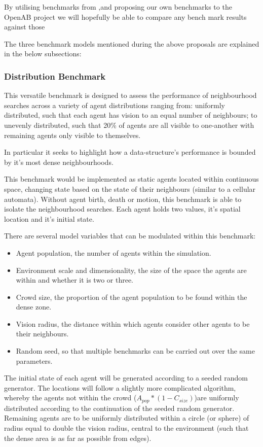     By utilising benchmarks from ,and proposing our own benchmarks to the OpenAB project we will hopefully be able to compare any bench mark results against those
    
    The three benchmark models mentioned during the above proposals are explained in the below subsections:    
    \subsubsection*{Distribution Benchmark}
        This versatile benchmark is designed to assess the performance of neighbourhood searches across a variety of agent distributions ranging from: uniformly distributed, such that each agent has vision to an equal number of neighbours; to unevenly distributed, such that 20\% of agents are all visible to one-another with remaining agents only visible to themselves.
        
        In particular it seeks to highlight how a data-structure's performance is bounded by it's most dense neighbourhoods. 
        
        This benchmark would be implemented as static agents located within continuous space, changing state based on the state of their neighbours (similar to a cellular automata). Without agent birth, death or motion, this benchmark is able to isolate the neighbourhood searches. Each agent holds two values, it's spatial location and it's initial state.
        
        There are several model variables that can be modulated within this benchmark:
        \begin{itemize}
          \item Agent population, the number of agents within the simulation.
          \item Environment scale and dimensionality, the size of the space the agents are within and whether it is two or three.
          \item Crowd size, the proportion of the agent population to be found within the dense zone.
          \item Vision radius, the distance within which agents consider other agents to be their neighbours.
          \item Random seed, so that multiple benchmarks can be carried out over the same parameters.
        \end{itemize}
        
        The initial state of each agent will be generated according to a seeded random generator. The locations will follow a slightly more complicated algorithm, whereby the agents not within the crowd ($A_{pop} * (1-C_{size})$)are uniformly distributed according to the continuation of the seeded random generator. Remaining agents are to be uniformly distributed within a circle (or sphere) of radius equal to double the vision radius, central to the environment (such that the dense area is as far as possible from edges).
        
